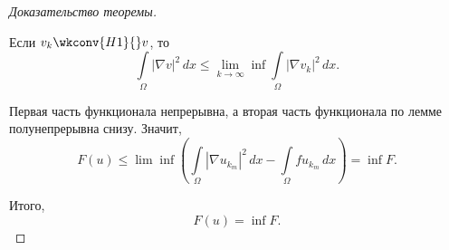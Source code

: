 \begin{proof}[Доказательство теоремы]
\begin{lemma} Если  $v_k \wkconv{H1}{} v$, то 
$$ \int \limits_\Omega | \nabla v| ^2 \, dx \leq \lim_{k \to \infty} \inf \int \limits_\Omega | \nabla v_k|^2 \, dx.$$
\end{lemma}
Первая часть функционала непрерывна, а вторая часть функционала по лемме полунепрерывна снизу. Значит,
$$ F(u) \leq \lim \inf \left( \int \limits_\Omega | \nabla u_{k_m}|^2 \, dx - \int \limits_\Omega f u_{k_m} \, dx \right) = \inf F.$$

Итого,
$$ F(u) = \inf F.$$

\end{proof}

